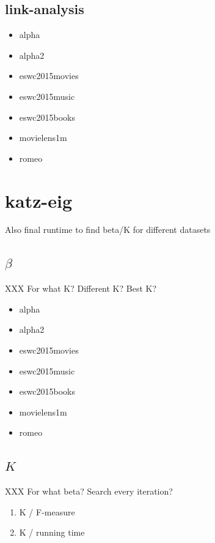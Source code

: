 \subsection{link-analysis}

\begin{itemize}
    \item alpha
    \item alpha2
    \item eswc2015movies
    \item eswc2015music
    \item eswc2015books
    \item movielens1m
    \item romeo
\end{itemize}


\section{katz-eig}

Also final runtime to find beta/K for different datasets

\subsection{$\beta$}

XXX For what K? Different K? Best K?

\begin{itemize}
    \item alpha
    \item alpha2
    \item eswc2015movies
    \item eswc2015music
    \item eswc2015books
    \item movielens1m
    \item romeo
\end{itemize}


\subsection{$K$}

XXX For what beta? Search every iteration?

\begin{enumerate}
    \item K / F-measure
    \item K / running time
\end{enumerate}

